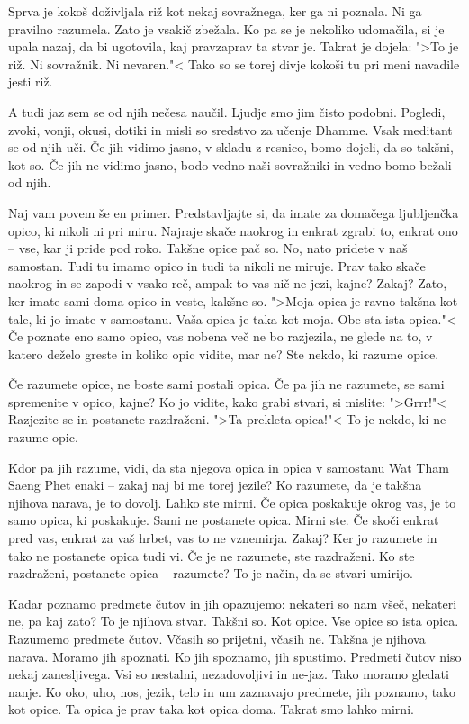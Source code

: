 Sprva je kokoš doživljala riž kot nekaj sovražnega, ker ga ni poznala. Ni ga pravilno razumela. Zato je vsakič zbežala. Ko pa se je nekoliko udomačila, si je upala nazaj, da bi ugotovila, kaj pravzaprav ta stvar je. Takrat je dojela: ">To je riž. Ni sovražnik. Ni nevaren."< Tako so se torej divje kokoši tu pri meni navadile jesti riž.

A tudi jaz sem se od njih nečesa naučil. Ljudje smo jim čisto podobni. Pogledi, zvoki, vonji, okusi, dotiki in misli so sredstvo za učenje Dhamme. Vsak meditant se od njih uči. Če jih vidimo jasno, v skladu z resnico, bomo dojeli, da so takšni, kot so. Če jih ne vidimo jasno, bodo vedno naši sovražniki in vedno bomo bežali od njih.

\clearpage


Naj vam povem še en primer. Predstavljajte si, da imate za domačega ljubljenčka opico, ki nikoli ni pri miru. Najraje skače naokrog in enkrat zgrabi to, enkrat ono – vse, kar ji pride pod roko. Takšne opice pač so. No, nato pridete v naš samostan. Tudi tu imamo opico in tudi ta nikoli ne miruje. Prav tako skače naokrog in se zapodi v vsako reč, ampak to vas nič ne jezi, kajne? Zakaj? Zato, ker imate sami doma opico in veste, kakšne so. ">Moja opica je ravno takšna kot tale, ki jo imate v samostanu. Vaša opica je taka kot moja. Obe sta ista opica."< Če poznate eno samo opico, vas nobena več ne bo razjezila, ne glede na to, v katero deželo greste in koliko opic vidite, mar ne? Ste nekdo, ki razume opice.

Če razumete opice, ne boste sami postali opica. Če pa jih ne razumete, se sami spremenite v opico, kajne? Ko jo vidite, kako grabi stvari, si mislite: ">Grrr!"< Razjezite se in postanete razdraženi. ">Ta prekleta opica!"< To je nekdo, ki ne razume opic.

Kdor pa jih razume, vidi, da sta njegova opica in opica v samostanu Wat Tham Saeng Phet enaki – zakaj naj bi me torej jezile? Ko razumete, da je takšna njihova narava, je to dovolj. Lahko ste mirni. Če opica poskakuje okrog vas, je to samo opica, ki poskakuje. Sami ne postanete opica. Mirni ste. Če skoči enkrat pred vas, enkrat za vaš hrbet, vas to ne vznemirja. Zakaj? Ker jo razumete in tako ne postanete opica tudi vi. Če je ne razumete, ste razdraženi. Ko ste razdraženi, postanete opica – razumete? To je način, da se stvari umirijo.

Kadar poznamo predmete čutov in jih opazujemo: nekateri so nam všeč, nekateri ne, pa kaj zato? To je njihova stvar. Takšni so. Kot opice. Vse opice so ista opica. Razumemo predmete čutov. Včasih so prijetni, včasih ne. Takšna je njihova narava. Moramo jih spoznati. Ko jih spoznamo, jih spustimo. Predmeti čutov niso nekaj zanesljivega. Vsi so nestalni, nezadovoljivi in ne-jaz. Tako moramo gledati nanje. Ko oko, uho, nos, jezik, telo in um zaznavajo predmete, jih poznamo, tako kot opice. Ta opica je prav taka kot opica doma. Takrat smo lahko mirni.

